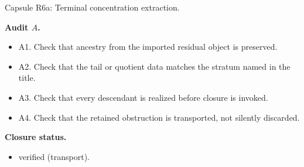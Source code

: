 \documentclass[11pt]{amsart}
\newcommand{\capsulefield}[1]{\par\smallskip\noindent\textbf{#1.}\ }
\begin{document}
\begin{proofcapsule}{Capsule R6a: Terminal concentration extraction.}
  \capsulefield{Audit \(A\)}
  \begin{itemize}[leftmargin=1.8em]
  \item A1. Check that ancestry from the imported residual object is preserved.
  \item A2. Check that the tail or quotient data matches the stratum named in the title.
  \item A3. Check that every descendant is realized before closure is invoked.
  \item A4. Check that the retained obstruction is transported, not silently discarded.
  \end{itemize}
  \capsulefield{Closure status}
  \begin{itemize}[leftmargin=1.8em]
  \item verified (transport).
  \end{itemize}
\end{proofcapsule}
\end{document}
